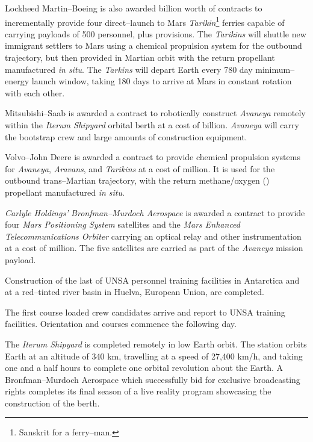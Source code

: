 Lockheed Martin--Boeing is also awarded  billion worth of contracts to incrementally provide four direct--launch to Mars {\it Tarikin}\footnote{Sanskrit  for a ferry--man.} ferries capable of carrying payloads of 500 personnel, plus provisions. The {\it Tarikins} will shuttle new immigrant settlers to Mars using a chemical  propulsion system for the outbound trajectory, but then provided in Martian orbit with the return  propellant manufactured {\it in situ}. The {\it Tarkins} will depart Earth every 780 day minimum--energy launch window, taking 180 days to arrive at Mars in constant rotation with each other.

Mitsubishi--Saab is awarded a contract to robotically construct {\it Avaneya} remotely within the {\it Iterum Shipyard} orbital berth at a cost of  billion. {\it Avaneya} will carry the bootstrap crew and large amounts of construction equipment.

Volvo--John Deere is awarded a contract to provide chemical propulsion systems for {\it Avaneya}, {\it Aravans}, and {\it Tarikins} at a cost of  million. It is used for the outbound trans--Martian trajectory, with the return methane/oxygen () propellant manufactured {\it in situ}.

{\it Carlyle Holdings'} {\it Bronfman--Murdoch Aerospace} is awarded a contract to provide four {\it Mars Positioning System} satellites and the {\it Mars Enhanced Telecommunications Orbiter} carrying an optical relay and other instrumentation at a cost of  million. The five satellites are carried as part of the {\it Avaneya} mission payload.
\StopTimelineDate

Construction of the last of UNSA personnel training facilities in Antarctica and at a red--tinted river basin in Huelva, European Union, are completed.
\StopTimelineDate

The first course loaded crew candidates arrive and report to UNSA training facilities. Orientation and courses commence the following day.
\StopTimelineDate

The {\it Iterum Shipyard} is completed remotely in low Earth orbit. The station orbits Earth at an altitude of 340 km, travelling at a speed of 27,400 km/h, and taking one and a half hours to complete one orbital revolution about the Earth. A Bronfman--Murdoch Aerospace which successfully bid for exclusive broadcasting rights completes its final season of a live reality program showcasing the construction of the berth.
\StopTimelineDate


